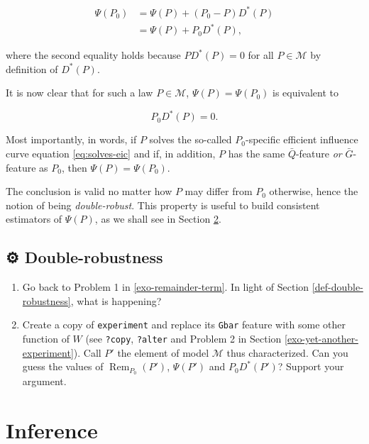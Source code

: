 \documentclass[
  11pt,
  openright,twoside]{book}
\DeclareMathOperator{\Rem}{Rem}
\newcommand{\gear}{\usebox{\gearbox}\;}
\newcommand{\calM}{\mathcal{M}}
\newcommand{\Gbar}{\bar{G}}
\newcommand{\Qbar}{\bar{Q}}
\theoremstyle{definition}
\theoremstyle{definition}
\theoremstyle{definition}
\theoremstyle{definition}
\theoremstyle{remark}
\begin{document}
\begin{align*} \Psi(P_0) &= \Psi(P) + (P_0 - P) D^*(P)\\
&= \Psi(P) + P_0 D^*(P),\end{align*}

where the second equality holds because \(PD^{*}(P) = 0\) for all \(P\in \calM\)
by definition of \(D^{*}(P)\).

It is now clear that for such a law \(P\in \calM\), \(\Psi(P) = \Psi(P_{0})\) is
equivalent to

\begin{equation} 
P_{0} D^{*}(P) = 0. \label{eq:solves-eic} 
\end{equation}

Most importantly, in words, if \(P\) solves the so-called \(P_{0}\)-specific
efficient influence curve equation \eqref{eq:solves-eic} and if, in addition,
\(P\) has the same \(\Qbar\)-feature \emph{or} \(\Gbar\)-feature as \(P_{0}\), then
\(\Psi(P) = \Psi(P_{0})\).

The conclusion is valid no matter how \(P\) may differ from \(P_{0}\) otherwise,
hence the notion of being \emph{double-robust}. This property is useful to build
consistent estimators of \(\Psi(P)\), as we shall see in Section
\ref{inference}.

\hypertarget{exo-double-robustness}{%
\section{\texorpdfstring{⚙ \gear Double-robustness}{⚙ Double-robustness}}\label{exo-double-robustness}}

\begin{enumerate}
\def\labelenumi{\arabic{enumi}.}
\item
  Go back to Problem 1 in \ref{exo-remainder-term}. In light of Section
  \ref{def-double-robustness}, what is happening?
\item
  Create a copy of \texttt{experiment} and replace its \texttt{Gbar} feature with some
  other function of \(W\) (see \texttt{?copy}, \texttt{?alter} and Problem 2 in Section
  \ref{exo-yet-another-experiment}). Call \(P'\) the element of model \(\calM\)
  thus characterized. Can you guess the values of \(\Rem_{P_{0}}(P')\),
  \(\Psi(P')\) and \(P_{0} D^{*}(P')\)? Support your argument.
\end{enumerate}

\hypertarget{inference}{%
\chapter{Inference}\label{inference}}
\end{document}
